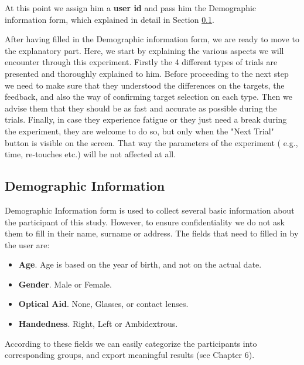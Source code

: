 At this point we assign him a \textbf{user id} and pass him the Demographic information form, which explained in detail in Section \ref{sec:demographic}.

After having filled in the Demographic information form, we are ready to move to the explanatory part. Here, we start by explaining the various aspects we will encounter through this experiment. Firstly the 4 different types of trials are presented and thoroughly explained to him. Before proceeding to the next step we need to make sure that they understood the differences on the targets, the feedback, and also the way of confirming target selection on each type. Then we advise them that they should be as fast and accurate as possible during the trials. Finally, in case they experience fatigue or they just need a break during the experiment, they are welcome to do so, but only when the "Next Trial" button is visible on the screen. That way the parameters of the experiment ( e.g., time, re-touches etc.) will be not affected at all.




\subsection{Demographic Information}
\label{sec:demographic}

Demographic Information form is used to collect several basic information about the participant of this study. However, to ensure confidentiality we do not ask them to fill in their  name, surname or address. The fields that need to filled in by the user are:


\begin{itemize}
	\item \textbf{Age}. Age is based on the year of birth, and not on the actual date. 
	\item \textbf{Gender}. Male or Female.
	\item \textbf{Optical Aid}. None, Glasses, or contact lenses. 
	\item \textbf{Handedness}. Right, Left or Ambidextrous.
\end{itemize}

According to these fields we can easily categorize the participants into corresponding groups, and export meaningful results (see Chapter 6).

